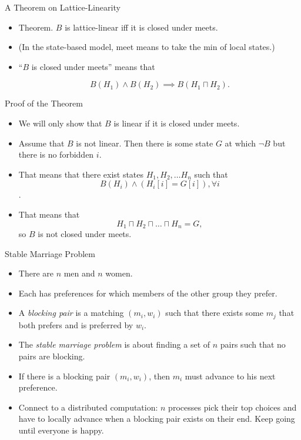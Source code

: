 \documentclass{beamer}
\begin{document}
\begin{frame}{A Theorem on Lattice-Linearity}
    \begin{itemize}
        \item Theorem. $B$ is lattice-linear iff it is closed
        under meets.
        \item (In the state-based model, meet means to take 
        the min of local states.)
        \item ``$B$ is closed under meets'' means that
        
        $$B(H_1) \wedge B(H_2) \implies B(H_1 \sqcap H_2).$$
    \end{itemize}
\end{frame}
\begin{frame}{Proof of the Theorem}
    \begin{itemize}
        \item We will only show that $B$ is linear if it
        is closed under meets.
        \item Assume that $B$ is not linear. Then there is some
        state $G$ at which $\neg B$ but there is no forbidden $i$.
        \item That means that there exist states $H_1, H_2, \dots H_n$
        such that $$B(H_i) \wedge (H_i[i] = G[i]), \forall i$$.
        \item That means that $$H_1 \sqcap H_2 \sqcap \dots \sqcap H_n = G,$$
        so $B$ is not closed under meets.
    \end{itemize}
\end{frame}

\begin{frame}{Stable Marriage Problem}
    \begin{itemize}
        \item There are $n$ men and $n$ women.
        \item Each has preferences for which members of the other group
        they prefer.
        \item A \emph{blocking pair} is a matching $(m_i, w_i)$ such that
        there exists some $m_j$ that both prefers and is preferred by $w_i$.
        \item The \emph{stable marriage problem} is about finding a set of
        $n$ pairs such that no pairs are blocking.
        \item If there is a blocking pair $(m_i, w_i)$, then $m_i$ must advance
        to his next preference.
        \vskip12pt
        \item Connect to a distributed computation: $n$ processes pick their
        top choices and have to locally advance when a blocking pair exists on their
        end. Keep going until everyone is happy.
    \end{itemize}
\end{frame}
\end{document}
